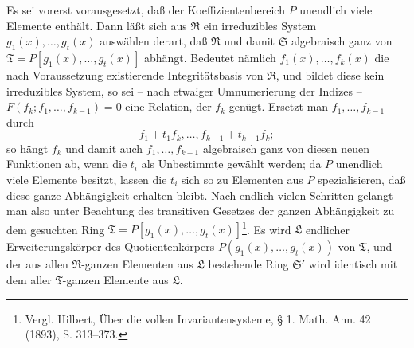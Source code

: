 Es sei vorerst vorausgesetzt, daß der Koeffizientenbereich $P$ unendlich viele Elemente enthält. Dann läßt sich aus $\mathfrak R$ ein irreduzibles System $g_1(x),\ldots,g_t(x)$ auswählen derart, daß $\mathfrak R$ und damit $\mathfrak S$ algebraisch ganz von $\mathfrak T=P[g_1(x),\ldots,g_t(x)]$ abhängt. Bedeutet nämlich $f_1(x),\ldots,f_k(x)$ die nach Voraussetzung existierende Integritätsbasis von $\mathfrak R$, und bildet diese kein irreduzibles System, so sei -- nach etwaiger Umnumerierung der Indizes -- $F(f_k;f_1,\ldots,f_{k-1})=0$ eine Relation, der $f_k$ genügt. Ersetzt man $f_1,\ldots,f_{k-1}$ durch
\[
 f_1+t_1f_k,\ldots,f_{k-1}+t_{k-1}f_k;
\]
so hängt $f_k$ und damit auch $f_1,\ldots,f_{k-1}$ algebraisch ganz von diesen neuen Funktionen ab, wenn die $t_i$ als Unbestimmte gewählt werden; da $P$ unendlich viele Elemente besitzt, lassen die $t_i$ sich so zu Elementen aus $P$ spezialisieren, daß diese ganze Abhängigkeit erhalten bleibt. Nach endlich vielen Schritten gelangt man also unter Beachtung des transitiven Gesetzes der ganzen Abhängigkeit zu dem gesuchten Ring $\mathfrak T=P[g_1(x),\ldots,g_t(x)]$\footnote{Vergl. Hilbert, Über die vollen Invariantensysteme, § 1. Math. Ann. 42 (1893), S. 313--373.}. Es wird $\mathfrak L$ endlicher Erweiterungskörper des Quotientenkörpers $P(g_1(x),\ldots,g_t(x))$ von $\mathfrak T$, und der aus allen $\mathfrak R$-ganzen Elementen aus $\mathfrak L$ bestehende Ring $\mathfrak S'$ wird identisch mit dem aller $\mathfrak T$-ganzen Elemente aus $\mathfrak L$.
